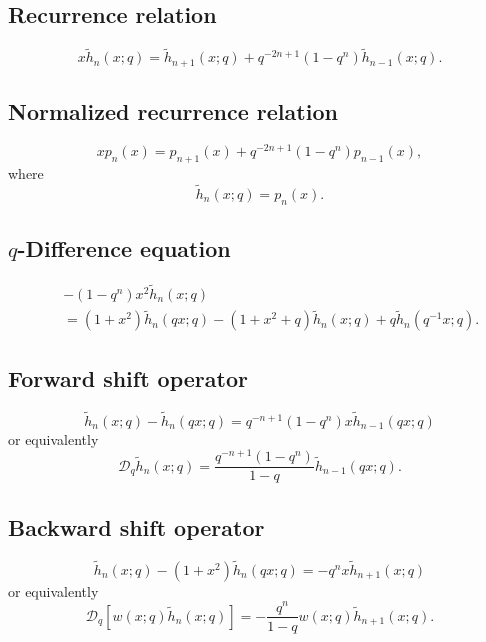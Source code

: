 \documentclass[envcountchap,graybox]{svmono}
\begin{document}
\subsection*{Recurrence relation}
\begin{equation}
\label{RecDiscreteqHermiteII}
x{\tilde h}_n(x;q)={\tilde h}_{n+1}(x;q)+q^{-2n+1}(1-q^n){\tilde h}_{n-1}(x;q).
\end{equation}

\subsection*{Normalized recurrence relation}
\begin{equation}
\label{NormRecDiscreteqHermiteII}
xp_n(x)=p_{n+1}(x)+q^{-2n+1}(1-q^n)p_{n-1}(x),
\end{equation}
where
$${\tilde h}_n(x;q)=p_n(x).$$

\subsection*{$q$-Difference equation}
\begin{eqnarray}
\label{dvDiscreteqHermiteII}
& &-(1-q^n)x^2{\tilde h}_n(x;q)\nonumber\\
& &{}=(1+x^2){\tilde h}_n(qx;q)-(1+x^2+q){\tilde h}_n(x;q)+q{\tilde h}_n(q^{-1}x;q).
\end{eqnarray}

\subsection*{Forward shift operator}
\begin{equation}
\label{shift1DiscreteqHermiteII-I}
\tilde{h}_n(x;q)-\tilde{h}_n(qx;q)=q^{-n+1}(1-q^n)x\tilde{h}_{n-1}(qx;q)
\end{equation}
or equivalently
\begin{equation}
\label{shift1DiscreteqHermiteII-II}
\mathcal{D}_q\tilde{h}_n(x;q)=\frac{q^{-n+1}(1-q^n)}{1-q}\tilde{h}_{n-1}(qx;q).
\end{equation}

\subsection*{Backward shift operator}
\begin{equation}
\label{shift2DiscreteqHermiteII-I}
\tilde{h}_n(x;q)-(1+x^2)\tilde{h}_n(qx;q)=-q^nx\tilde{h}_{n+1}(x;q)
\end{equation}
or equivalently
\begin{equation}
\label{shift2DiscreteqHermiteII-II}
\mathcal{D}_q\left[w(x;q)\tilde{h}_n(x;q)\right]
=-\frac{q^n}{1-q}w(x;q)\tilde{h}_{n+1}(x;q).
\end{equation}
\end{document}
